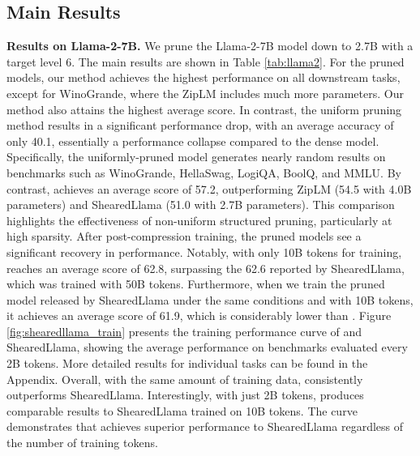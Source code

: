 \subsection{Main Results}
\noindent \textbf{Results on Llama-2-7B.} We prune the Llama-2-7B model down to 2.7B with a target level 6. The main results are shown in Table \ref{tab:llama2}. For the pruned models, our method achieves the highest performance on all downstream tasks, except for WinoGrande, where the ZipLM includes much more parameters. 
Our method also attains the highest average score. 
 In contrast, the uniform pruning method results in a significant performance drop, with an average accuracy of only 40.1, essentially a performance collapse compared to the dense model. Specifically, the uniformly-pruned model generates nearly random results on benchmarks such as WinoGrande, HellaSwag, LogiQA, BoolQ, and MMLU.
 By contrast, \sysname achieves an average score of 57.2, outperforming ZipLM (54.5 with 4.0B parameters) and ShearedLlama (51.0 with 2.7B parameters). This comparison highlights the effectiveness of non-uniform structured pruning, particularly at high sparsity. After post-compression training, the pruned models see a significant recovery in performance. Notably, with only 10B tokens for training, \sysname reaches an average score of 62.8, surpassing the 62.6 reported by ShearedLlama, which was trained with 50B tokens. Furthermore, when we train the pruned model released by ShearedLlama under the same conditions and with 10B tokens, it achieves an average score of 61.9, which is considerably lower than \sysname. Figure \ref{fig:shearedllama_train} presents the training performance curve of \sysname and ShearedLlama, showing the average performance on benchmarks evaluated every 2B tokens. More detailed results for individual tasks can be found in the Appendix. Overall, with the same amount of training data, \sysname consistently outperforms ShearedLlama. Interestingly, with just 2B tokens, \sysname produces comparable results to ShearedLlama trained on 10B tokens. The curve demonstrates that \sysname achieves superior performance to ShearedLlama regardless of the number of training tokens.



